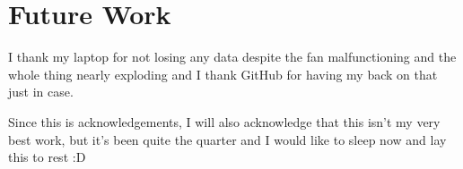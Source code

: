 \documentclass[preprint2]{aastex631}
\begin{document}
\section{Future Work}
\citep{Hogg+2019}

\begin{acknowledgements}
    I thank my laptop for not losing any data despite the fan malfunctioning and the whole thing nearly exploding and I thank GitHub for having my back on that just in case.
    
    Since this is acknowledgements, I will also acknowledge that this isn't my very best work, but it's been quite the quarter and I would like to sleep now and lay this to rest :D
\end{acknowledgements}


{}
\end{document}

